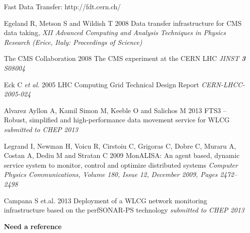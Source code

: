 

\begin{thebibliography}{1}

Fast Data Transfer: http://fdt.cern.ch/

  Egeland R, Metson S and Wildish T 2008 Data transfer infrastructure for CMS data taking,  {\it XII Advanced Computing and Analysis Techniques in Physics Research (Erice, Italy: Proceedings of Science)}

The CMS Collaboration 2008 The CMS experiment at the CERN LHC {\it JINST {\bf 3} S08004}

Eck C {\it et al.} 2005 LHC Computing Grid Technical Design Report {\it CERN-LHCC-2005-024}

Alvarez Ayllon A, Kamil Simon M, Keeble O and Salichos M 2013 FTS3 – Robust, simplified and high-performance data movement service for WLCG {\it submitted to CHEP 2013}

Legrand I, Newman H, Voicu R, Cirstoiu C, Grigoras C, Dobre C, Muraru A, Costan A, Dediu M and Stratan C 2009 MonALISA: An agent based, dynamic service system to monitor, control and optimize distributed systems {\it Computer Physics Communications, Volume 180, Issue 12, December 2009, Pages 2472–2498}

  Campana S et.al. 2013 Deployment of a WLCG network monitoring infrastructure based on the perfSONAR-PS technology {\it submitted to CHEP 2013}

 \textbf{Need a reference}


\end{thebibliography}
